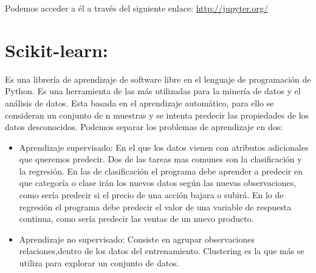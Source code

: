 Podemos acceder a él a través del siguiente enlace: 
\url{http://jupyter.org/}	

\section{Scikit-learn:}
Es una librería de aprendizaje de software libre en el lenguaje de programación de Python. Es una herramienta de las más utilizadas para la minería de datos y el análisis de datos\cite{wiki:scikitlearn}. 
Esta basada en el aprendizaje automático, para ello se consideran un conjunto de n muestras y se intenta predecir las propiedades de los datos desconocidos. Podemos separar los problemas de aprendizaje en dos\cite{scikitlearn}:

	\begin{itemize}
		\item Aprendizaje supervisado: En el que los datos vienen con atributos adicionales que queremos predecir. Dos de las tareas mas comunes son la clasificación y la regresión. En las de clasificación el programa debe aprender a predecir en que categoría o clase irán los nuevos datos según las nuevas observaciones, como sería predecir si el precio de una acción bajara o subirá. En lo de regresión el programa debe predecir el valor de una variable de respuesta continua, como sería predecir las ventas de un nuevo producto. 

		\item Aprendizaje no supervisado: Consiste en agrupar observaciones relaciones,dentro de los datos del entrenamiento. Clustering es la que más se utiliza para explorar un conjunto de datos.

	\end{itemize}
